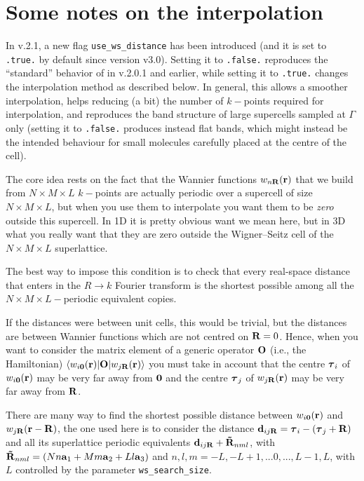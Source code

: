\chapter{\label{chap:interpolation}Some notes on the interpolation}

In \wannier{} v.2.1, a new flag {\tt use\_ws\_distance} has been
introduced (and it is set to {\tt .true.} by default since
version v3.0). Setting it to {\tt .false.} reproduces the
``standard'' behavior of \wannier{} in v.2.0.1 and earlier,
while setting it to {\tt .true.} changes the interpolation method
as described below. In general, this allows a smoother interpolation,
helps reducing (a bit) the number of $k-$points required for interpolation,
and reproduces the band structure of large supercells sampled at $\Gamma$
only (setting it to {\tt .false.} produces instead flat bands, which
might instead be the intended behaviour for small molecules carefully
placed at the centre of the cell).

The core idea rests on the fact that the Wannier functions $w_{n\bm{\mathrm{R}}}(\bm{\mathrm{r}})$
that we build from $N\times M\times L$ $k-$points are actually periodic
over a supercell of size $N\times M\times L$, but when you use
them to interpolate you want them to be \emph{zero} outside this supercell.
In 1D it is pretty obvious want we mean here, but in 3D what you really
want that they are zero outside the Wigner--Seitz cell of the
$N\times M\times L$ superlattice.

The best way to impose this condition is to check that every real-space
distance that enters in the $R\to k$ Fourier transform is the shortest possible
among all the $N\times M\times L-$periodic equivalent copies.

If the distances were between unit cells, this would be trivial, but the
distances are between Wannier functions which are not centred on $\bm{\mathrm{R}}=0$.
Hence, when you want to consider the matrix element of a generic operator $\bm{\mathrm{O}}$
(i.e., the Hamiltonian)  $\langle w_{i\bm{\mathrm{0}}}(\bm{\mathrm{r}})|\bm{\mathrm{O}}|w_{j\bm{\mathrm{R}}}(\bm{\mathrm{r}})\rangle$
you must take in account that the centre $\bm{\mathrm{\tau}}_i$ of $w_{i\bm{\mathrm{0}}}(\bm{\mathrm{r}})$ may
be very far away from $\bm{\mathrm{0}}$ and the centre $\bm{\mathrm{\tau}}_j$ of $w_{j\bm{\mathrm{R}}}(\bm{\mathrm{r}})$
may be very far away from $\bm{\mathrm{R}}$.

There are many way to find the shortest possible distance between $w_{i\bm{\mathrm{0}}}(\bm{\mathrm{r}})$ and
$w_{j\bm{\mathrm{R}}}(\bm{\mathrm{r}}-\bm{\mathrm{R}})$, the one used here is to consider the distance
$\bm{\mathrm{d}}_{ij\bm{\mathrm{R}}} = \bm{\mathrm{\tau}}_i - (\bm{\mathrm{\tau}}_j+\bm{\mathrm{R}})$
and all its superlattice periodic equivalents
$\bm{\mathrm{d}}_{ij\bm{\mathrm{R}}}+ \bm{\mathrm{\tilde R}}_{nml}$, with
$\bm{\mathrm{\tilde R}}_{nml} = (Nn\bm{\mathrm{a}}_1 + Mm\bm{\mathrm{a}}_2 + Ll\bm{\mathrm{a}}_3)$
and $n,l,m = {-L,-L+1,...0,...,L-1,L}$, with $L$ controlled by the parameter {\tt ws\_search\_size}.

